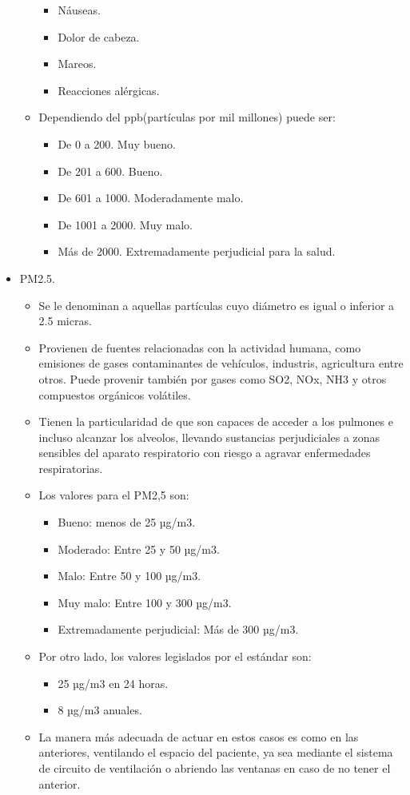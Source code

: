 \documentclass[a4paper]{article}
\begin{document}
\begin{itemize}
\begin{itemize}
				\begin{itemize}
					\item Náuseas.
					\item Dolor de cabeza.
					\item Mareos.
					\item Reacciones alérgicas.
				\end{itemize}
			\item Dependiendo del ppb(partículas por mil millones) puede ser:
				\begin{itemize}
					\item De 0 a 200. Muy bueno.
					\item De 201 a 600. Bueno.
					\item De 601 a 1000. Moderadamente malo.
					\item De 1001 a 2000. Muy malo.
					\item Más de 2000. Extremadamente perjudicial para la salud.		
				\end{itemize}
		\end{itemize}
	\item PM2.5.
		\begin{itemize}
			\item Se le denominan a aquellas partículas cuyo diámetro es igual o inferior a 2.5 micras. 
			\item Provienen de fuentes relacionadas con la actividad humana, como emisiones de gases contaminantes de vehículos, industris, agricultura entre otros. Puede provenir también por gases como SO2, NOx, NH3 y otros compuestos orgánicos volátiles.
			\item Tienen la particularidad de que son capaces de acceder a los pulmones e incluso alcanzar los alveolos, llevando sustancias perjudiciales a zonas sensibles del aparato respiratorio con riesgo a agravar enfermedades respiratorias.
			\item Los valores para el PM2,5 son:
			\begin{itemize}
				\item Bueno: menos de 25 µg/m3.
				\item Moderado: Entre 25 y 50 µg/m3.
				\item Malo: Entre 50 y 100 µg/m3.
				\item Muy malo: Entre 100 y 300 µg/m3.
				\item Extremadamente perjudicial: Más de 300 µg/m3.
			\end{itemize}
			\item Por otro lado, los valores legislados por el estándar son:
			\begin{itemize}
				\item 25 µg/m3 en 24 horas.
				\item 8 µg/m3 anuales.
			\end{itemize}
			\item La manera más adecuada de actuar en estos casos es como en las anteriores, ventilando el espacio del paciente, ya sea mediante el sistema de circuito de ventilación o abriendo las ventanas en caso de no tener el anterior.
		\end{itemize}
\end{itemize}
\end{document}
